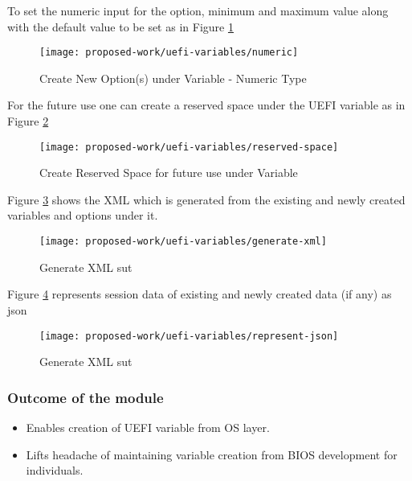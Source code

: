 To set the numeric input for the option, minimum and maximum value along with the default value to be set as in Figure \ref{fig:uefi-variable-numeric}
\begin{figure}[!htbp]
	\centering
	\texttt{[image: proposed-work/uefi-variables/numeric]}
	\caption{Create New Option(s) under Variable - Numeric Type}\label{fig:uefi-variable-numeric}
\end{figure}

For the future use one can create a reserved space under the UEFI variable as in Figure \ref{fig:uefi-variable-reserved-space}
\begin{figure}[!htbp]
	\centering
	\texttt{[image: proposed-work/uefi-variables/reserved-space]}
	\caption{Create Reserved Space for future use under Variable}\label{fig:uefi-variable-reserved-space}
\end{figure}


Figure \ref{fig:uefi-variable-generate-xml} shows the XML which is generated from the existing and newly created variables and options under it.
\begin{figure}[!htbp]
	\centering
	\texttt{[image: proposed-work/uefi-variables/generate-xml]}
	\caption{Generate XML \gls{sut}}\label{fig:uefi-variable-generate-xml}
\end{figure}

Figure \ref{fig:uefi-variable-represent-json} represents session data of existing and newly created data (if any) as json
\begin{figure}[!htbp]
	\centering
	\texttt{[image: proposed-work/uefi-variables/represent-json]}
	\caption{Generate XML \gls{sut}}\label{fig:uefi-variable-represent-json}
\end{figure}


\subsubsection{Outcome of the module}
\begin{itemize}
	\item Enables creation of UEFI variable from OS layer.
	\item Lifts headache of maintaining variable creation from BIOS development for individuals.
\end{itemize}


